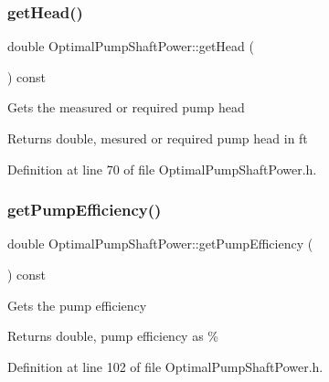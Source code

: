 \mbox{\label{class_optimal_pump_shaft_power_abb285a8a256c10187113c34db1a4462b}} 
\subsubsection{\texorpdfstring{get\+Head()}{getHead()}}
{\footnotesize\ttfamily double Optimal\+Pump\+Shaft\+Power\+::get\+Head (\begin{DoxyParamCaption}{ }\end{DoxyParamCaption}) const\hspace{0.3cm}{\ttfamily [inline]}}

Gets the measured or required pump head \begin{DoxyReturn}{Returns}
double, mesured or required pump head in ft 
\end{DoxyReturn}


Definition at line 70 of file Optimal\+Pump\+Shaft\+Power.\+h.

\mbox{\label{class_optimal_pump_shaft_power_a77b9c639438f9d6008c20948f173a2c4}} 
\subsubsection{\texorpdfstring{get\+Pump\+Efficiency()}{getPumpEfficiency()}}
{\footnotesize\ttfamily double Optimal\+Pump\+Shaft\+Power\+::get\+Pump\+Efficiency (\begin{DoxyParamCaption}{ }\end{DoxyParamCaption}) const\hspace{0.3cm}{\ttfamily [inline]}}

Gets the pump efficiency \begin{DoxyReturn}{Returns}
double, pump efficiency as \% 
\end{DoxyReturn}


Definition at line 102 of file Optimal\+Pump\+Shaft\+Power.\+h.

\mbox{\label{class_optimal_pump_shaft_power_a607d32c56edece639e03007adc1bf325}} 
